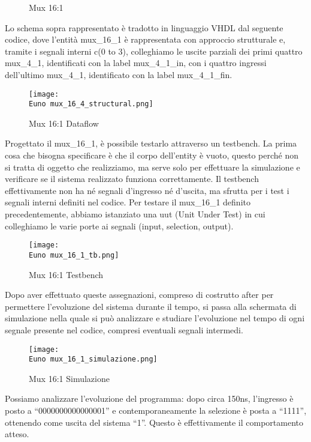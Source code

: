\documentclass[12pt]{article}
\def \Euno {Allegati/Esercizio1/}
\begin{document}
\begin{figure}[ht]
    \centering
    
    \caption{Mux 16:1}
\end{figure}
\newpage
Lo schema sopra rappresentato è tradotto in linguaggio VHDL dal seguente codice, dove l’entità mux\_16\_1 è rappresentata con approccio strutturale e, tramite i segnali interni c(0 to 3), colleghiamo le uscite parziali dei primi quattro mux\_4\_1, identificati con la label mux\_4\_1\_in, con i quattro ingressi dell’ultimo mux\_4\_1, identificato con la label mux\_4\_1\_fin.
\begin{figure}[ht]
    \centering
    \texttt{[image: \\Euno mux\_16\_4\_structural.png]}
    \caption{Mux 16:1 Dataflow}
\end{figure}
\newpage
Progettato il mux\_16\_1, è possibile testarlo attraverso un testbench. La prima cosa che bisogna specificare è che il corpo dell’entity è vuoto, questo perché non si tratta di oggetto che realizziamo, ma serve solo per effettuare la simulazione e verificare se il sistema realizzato funziona correttamente. Il testbench effettivamente non ha né segnali d’ingresso né d’uscita, ma sfrutta per i test i segnali interni definiti nel codice. Per testare il mux\_16\_1 definito precedentemente, abbiamo istanziato una uut (Unit
Under Test) in cui colleghiamo le varie porte ai segnali (input, selection, output).\newline
\begin{figure}[h]
    \centering
    \texttt{[image: \\Euno mux\_16\_1\_tb.png]}
    \caption{Mux 16:1 Testbench}
\end{figure}
\newpage Dopo aver effettuato queste assegnazioni, compreso di costrutto after per permettere l’evoluzione del sistema durante il tempo, si passa alla schermata di simulazione nella quale si può analizzare e studiare l’evoluzione nel tempo di ogni segnale presente nel codice, compresi eventuali segnali intermedi.
\begin{figure}[ht]
    \centering
    \texttt{[image: \\Euno mux\_16\_1\_simulazione.png]}
    \caption{Mux 16:1 Simulazione}
\end{figure}
\newline Possiamo analizzare l’evoluzione del programma:
dopo circa 150ns, l’ingresso è posto a “0000000000000001” e contemporaneamente la selezione è posta a “1111”, ottenendo come uscita del sistema “1”. Questo è effettivamente il comportamento atteso.
\newpage
\end{document}

